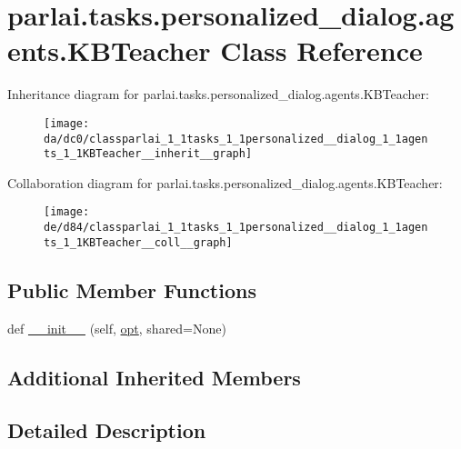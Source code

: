 \hypertarget{classparlai_1_1tasks_1_1personalized__dialog_1_1agents_1_1KBTeacher}{}\section{parlai.\+tasks.\+personalized\+\_\+dialog.\+agents.\+K\+B\+Teacher Class Reference}
\label{classparlai_1_1tasks_1_1personalized__dialog_1_1agents_1_1KBTeacher}


Inheritance diagram for parlai.\+tasks.\+personalized\+\_\+dialog.\+agents.\+K\+B\+Teacher\+:
\nopagebreak
\begin{figure}[H]
\begin{center}
\leavevmode
\texttt{[image: da/dc0/classparlai\_1\_1tasks\_1\_1personalized\_\_dialog\_1\_1agents\_1\_1KBTeacher\_\_inherit\_\_graph]}
\end{center}
\end{figure}


Collaboration diagram for parlai.\+tasks.\+personalized\+\_\+dialog.\+agents.\+K\+B\+Teacher\+:
\nopagebreak
\begin{figure}[H]
\begin{center}
\leavevmode
\texttt{[image: de/d84/classparlai\_1\_1tasks\_1\_1personalized\_\_dialog\_1\_1agents\_1\_1KBTeacher\_\_coll\_\_graph]}
\end{center}
\end{figure}
\subsection*{Public Member Functions}
\begin{DoxyCompactItemize}
\item 
def \hyperlink{classparlai_1_1tasks_1_1personalized__dialog_1_1agents_1_1KBTeacher_a1e5c4c2117b3fee7d37aa919d961b2f2}{\+\_\+\+\_\+init\+\_\+\+\_\+} (self, \hyperlink{classparlai_1_1core_1_1teachers_1_1FbDialogTeacher_af7a9ec497b9cd0292d7b8fa220da7c28}{opt}, shared=None)
\end{DoxyCompactItemize}
\subsection*{Additional Inherited Members}


\subsection{Detailed Description}


